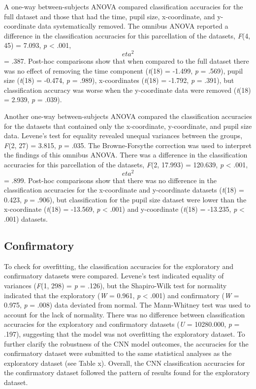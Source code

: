 A one-way between-subjects ANOVA compared classification accuracies for the full dataset and those that had the time, pupil size, x-coordinate, and y-coordinate data systematically removed. The omnibus ANOVA reported a difference in the classification accuracies for this parcellation of the datasets, \textit{F}(4, 45) = 7.093, \textit{p} < .001, \textit{\[eta^{2}\]} = .387. Post-hoc comparisons show that when compared to the full dataset there was no effect of removing the time component (\textit{t}(18) = -1.499, \textit{p} = .569), pupil size (\textit{t}(18) = -0.474, \textit{p} = .989), x-coordinates (\textit{t}(18) = -1.792, \textit{p} = .391), but classification accuracy was worse when the y-coordinate data were removed (\textit{t}(18) = 2.939, \textit{p} = .039).

Another one-way between-subjects ANOVA compared the classification accuracies for the datasets that contained only the x-coordinate, y-coordinate, and pupil size data. Levene's test for equality revealed unequal variances between the groups, \textit{F}(2, 27) = 3.815, \textit{p} = .035. The Browne-Forsythe correction was used to interpret the findings of this omnibus ANOVA. There was a difference in the classification accuracies for this parcellation of the datasets, \textit{F}(2, 17.993) = 120.639, \textit{p} < .001, \textit{\[eta^{2}\]} = .899. Post-hoc comparisons show that there was no difference in the classification accuracies for the x-coordinate and y-coordinate datasets (\textit{t}(18) = 0.423, \textit{p} = .906), but classification for the pupil size dataset were lower than the x-coordinate (\textit{t}(18) = -13.569, \textit{p} < .001) and y-coordinate (\textit{t}(18) = -13.235, \textit{p} < .001) datasets.

\subsection{Confirmatory}
To check for overfitting, the classification accuracies for the exploratory and confirmatory datasets were compared. Levene's test indicated equality of variances (\textit{F}(1, 298) = \textit{p} = .126), but the Shapiro-Wilk test for normality indicated that the exploratory (\textit{W} = 0.961, \textit{p} < .001) and confirmatory (\textit{W} = 0.975, \textit{p} = .008) data deviated from normal. The Mann-Whitney test was used to account for the lack of normality. There was no difference between classification accuracies for the exploratory and confirmatory datasets (\textit{U} = 10280.000, \textit{p} = .197), suggesting that the model was not overfitting the exploratory dataset. To further clarify the robustness of the CNN model outcomes, the accuracies for the confirmatory dataset were submitted to the same statistical analyses as the exploratory dataset (see Table x). Overall, the CNN classification accuracies for the confirmatory dataset followed the pattern of results found for the exploratory dataset.

